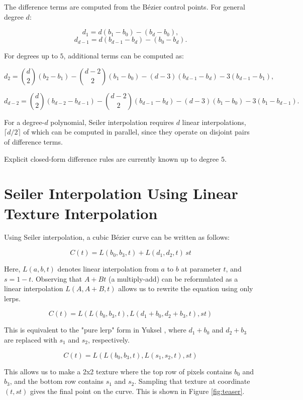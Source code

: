 \documentclass{jcgt}
\begin{document}
The difference terms are computed from the Bézier control points. 
For general degree $d$:

\[
d_1 = d(b_1 - b_0) - (b_d - b_0),
\]
\[
d_{d-1} = d(b_{d-1} - b_d) - (b_0 - b_d).
\]

For degrees up to $5$, additional terms can be computed as:

\[
d_2 =
\binom{d}{2}(b_2 - b_1)
- \binom{d-2}{2}(b_1 - b_0)
- (d-3)(b_{d-1} - b_d)
- 3(b_{d-1} - b_1),
\]

\[
d_{d-2} =
\binom{d}{2}(b_{d-2} - b_{d-1})
- \binom{d-2}{2}(b_{d-1} - b_d)
- (d-3)(b_1 - b_0)
- 3(b_1 - b_{d-1}).
\]

For a degree-$d$ polynomial, Seiler interpolation requires $d$ linear 
interpolations, $\lceil d/2 \rceil$ of which can be computed in parallel, 
since they operate on disjoint pairs of difference terms.

Explicit closed-form difference rules are currently known up to degree $5$.
\section{Seiler Interpolation Using Linear Texture Interpolation}

Using Seiler interpolation, a cubic Bézier curve can be written as follows:

\begin{equation}
C(t) = L(b_0, b_3, t) + L(d_1, d_2, t)\,st
\end{equation}

Here, $L(a,b,t)$ denotes linear interpolation from $a$ to $b$ at parameter $t$, and $s = 1-t$. Observing that $A+Bt$ (a multiply-add) can be reformulated as a linear interpolation $L(A, A+B, t)$ allows us to rewrite the equation using only lerps.

\begin{equation}
C(t) = L( L(b_0, b_3, t), L(d_1 + b_0, d_2 + b_3, t), st)
\end{equation}

This is equivalent to the "pure lerp" form in Yuksel \cite{10.1145/3641233.3664331}, where $d_1 + b_0$ and $d_2 + b_3$ are replaced with $s_1$ and $s_2$, respectively.

\begin{equation}
C(t) = L( L(b_0, b_3, t), L(s_1, s_2, t), st)
\end{equation}

This allows us to make a 2x2 texture where the top row of pixels contains $b_0$ and $b_3$, and the bottom row contains $s_1$ and $s_2$. Sampling that texture at coordinate $(t, st)$ gives the final point on the curve. This is shown in Figure \ref{fig:teaser}.
\end{document}

